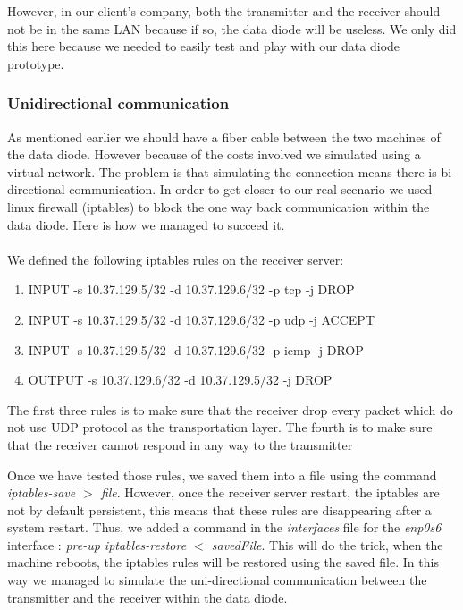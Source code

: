 \documentclass[a4paper,10pt]{article}
\begin{document}
However, in our client's company, both the transmitter and the receiver should not be in the same LAN because if so, the data diode will be useless. We only did this here because we needed to easily test and play with our data diode prototype.
\subsubsection{Unidirectional communication}
As mentioned earlier we should have a fiber cable between the two machines of the data diode. However because of the costs involved we simulated using a virtual network. The problem is that simulating the connection means there is bi-directional communication. In order to get closer to our real scenario we used linux firewall (iptables) to block the one way back communication within the data diode. Here is how we managed to succeed it.

\paragraph{}We defined the following iptables rules on the receiver server:
\begin{enumerate}
\item INPUT -s 10.37.129.5/32 -d 10.37.129.6/32 -p tcp -j DROP
\item INPUT -s 10.37.129.5/32 -d 10.37.129.6/32 -p udp -j ACCEPT
\item INPUT -s 10.37.129.5/32 -d 10.37.129.6/32 -p icmp -j DROP
\item OUTPUT -s 10.37.129.6/32 -d 10.37.129.5/32 -j DROP
\end{enumerate}

The first three rules is to make sure that the receiver drop every packet which do not use UDP protocol as the transportation layer. The fourth is to make sure that the receiver cannot respond in any way to the transmitter

Once we have tested those rules, we saved them into a file using the command \emph{iptables-save $>$ file}. However, once the receiver server restart, the iptables are not by default persistent, this means that these rules are disappearing after a system restart. Thus, we added a command in the \emph{interfaces} file for the \emph{enp0s6} interface : \emph{pre-up iptables-restore $<$ savedFile}. This will do the trick, when the machine reboots, the iptables rules will be restored using the saved file. In this way we managed to simulate the uni-directional communication between the transmitter and the receiver within the data diode.
\end{document}

